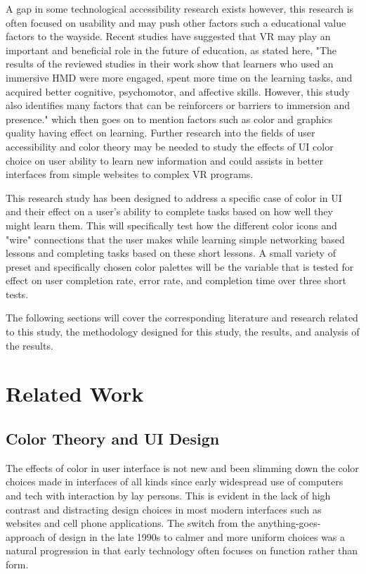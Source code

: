 \documentclass[acmlarge]{acmart}
\begin{document}
A gap in some technological accessibility research exists however, this research is often focused on usability and may
push other factors such a educational value factors to the wayside. Recent studies have suggested that VR may play an important and beneficial role in
the future of education, as stated here, "The results of the reviewed studies in their work show that learners who used an immersive HMD were more engaged,
spent more time on the learning tasks, and acquired better cognitive, psychomotor, and affective skills. However, this study also identifies many factors
that can be reinforcers or barriers to immersion and presence." \cite{radianti2020} which then goes on to mention factors such as color and graphics quality
having effect on learning. Further research into the fields of user accessibility and color theory may be needed to study the effects of UI color choice on user ability
to learn new information and could assists in better interfaces from simple websites to complex VR programs.

This research study has been designed to address a specific case of color in UI and their
effect on a user's ability to complete tasks based on how well they might learn them. This will specifically test how the different color icons and "wire"
connections that the user makes while learning simple networking based lessons and completing tasks based on these short lessons. A small variety of preset
and specifically chosen color palettes will be the variable that is tested for effect on user completion rate, error rate, and completion time over three short 
tests.

The following sections will cover the corresponding literature and research related to this study, the methodology designed for this study, the results, and analysis of the results.


\section{Related Work}

\subsection{Color Theory and UI Design}
The effects of color in user interface is not new and been slimming down the color choices made in interfaces of all kinds since early widespread use of computers and 
tech with interaction by lay persons. This is evident in the lack of high contrast and distracting design choices in most modern interfaces such as websites and cell phone applications.
The switch from the anything-goes-approach of design in the late 1990s to calmer and more uniform choices was a natural progression in that early technology often focuses on function rather
than form. 
\end{document}

